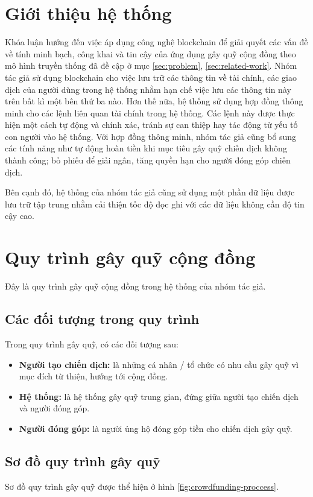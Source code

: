 \documentclass[../main-report.tex]{subfiles}
\begin{document}
\section{Giới thiệu hệ thống}
Khóa luận hướng đến việc áp dụng công nghệ \gls{blockchain} để giải quyết các vấn đề về tính minh bạch, công khai và tin cậy của ứng dụng gây quỹ cộng đồng theo mô hình truyền thống đã đề cập ở mục \ref{sec:problem}, \ref{sec:related-work}. Nhóm tác giả sử dụng \gls{blockchain} cho việc lưu trữ các thông tin về tài chính, các giao dịch của người dùng trong hệ thống nhằm hạn chế việc lưu các thông tin này trên bất kì một bên thứ ba nào. Hơn thế nữa, hệ thống sử dụng hợp đồng thông minh cho các lệnh liên quan tài chính trong hệ thống. Các lệnh này được thực hiện một cách tự động và chính xác, tránh sự can thiệp hay tác động từ yếu tố con người vào hệ thống. Với hợp đồng thông minh, nhóm tác giả cũng bổ sung các tính năng như tự động hoàn tiền khi mục tiêu gây quỹ chiến dịch không thành công; bỏ phiếu để giải ngân, tăng quyền hạn cho người đóng góp chiến dịch.

Bên cạnh đó, hệ thống của nhóm tác giả cũng sử dụng một phần dữ liệu được lưu trữ tập trung nhằm cải thiện tốc độ đọc ghi với các dữ liệu không cần độ tin cậy cao.

\section{Quy trình gây quỹ cộng đồng}
Đây là quy trình gây quỹ cộng đồng trong hệ thống của nhóm tác giả.
\subsection{Các đối tượng trong quy trình}
Trong quy trình gây quỹ, có các đối tượng sau:
\begin{itemize}
\item \textbf{Người tạo chiến dịch:} là những cá nhân / tổ chức có nhu cầu gây quỹ vì mục đích từ thiện, hướng tới cộng đồng.
\item \textbf{Hệ thống:} là hệ thống gây quỹ trung gian, đứng giữa người tạo chiến dịch và người đóng góp.
\item \textbf{Người đóng góp:} là người ủng hộ đóng góp tiền cho chiến dịch gây quỹ.
\end{itemize}

\subsection{Sơ đồ quy trình gây quỹ}
Sơ đồ quy trình gây quỹ được thể hiện ở hình \ref{fig:crowdfunding-proccess}.
\end{document}
